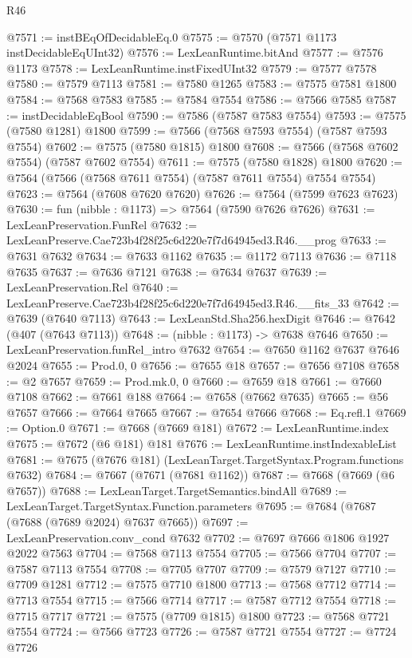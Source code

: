\begin{lexlean}{R46}
\begin{coremodule}
@7571 := instBEqOfDecidableEq.{0}
@7575 := @7570 (@7571 @1173 instDecidableEqUInt32)
@7576 := LexLeanRuntime.bitAnd
@7577 := @7576 @1173
@7578 := LexLeanRuntime.instFixedUInt32
@7579 := @7577 @7578
@7580 := @7579 @7113
@7581 := @7580 @1265
@7583 := @7575 @7581 @1800
@7584 := @7568 @7583
@7585 := @7584 @7554
@7586 := @7566 @7585
@7587 := instDecidableEqBool
@7590 := @7586 (@7587 @7583 @7554)
@7593 := @7575 (@7580 @1281) @1800
@7599 := @7566 (@7568 @7593 @7554) (@7587 @7593 @7554)
@7602 := @7575 (@7580 @1815) @1800
@7608 := @7566 (@7568 @7602 @7554) (@7587 @7602 @7554)
@7611 := @7575 (@7580 @1828) @1800
@7620 := @7564 (@7566 (@7568 @7611 @7554) (@7587 @7611 @7554) @7554 @7554)
@7623 := @7564 (@7608 @7620 @7620)
@7626 := @7564 (@7599 @7623 @7623)
@7630 := fun (nibble : @1173) => @7564 (@7590 @7626 @7626)
@7631 := LexLeanPreservation.FunRel
@7632 := LexLeanPreserve.Cae723b4f28f25c6d220e7f7d64945ed3.R46.__prog
@7633 := @7631 @7632
@7634 := @7633 @1162
@7635 := @1172 @7113
@7636 := @7118 @7635
@7637 := @7636 @7121
@7638 := @7634 @7637
@7639 := LexLeanPreservation.Rel
@7640 := LexLeanPreserve.Cae723b4f28f25c6d220e7f7d64945ed3.R46.__fits_33
@7642 := @7639 (@7640 @7113)
@7643 := LexLeanStd.Sha256.hexDigit
@7646 := @7642 (@407 (@7643 @7113))
@7648 := (nibble : @1173) -> @7638 @7646
@7650 := LexLeanPreservation.funRel_intro @7632
@7654 := @7650 @1162 @7637 @7646 @2024
@7655 := Prod.{0, 0}
@7656 := @7655 @18
@7657 := @7656 @7108
@7658 := @2 @7657
@7659 := Prod.mk.{0, 0}
@7660 := @7659 @18
@7661 := @7660 @7108
@7662 := @7661 @188
@7664 := @7658 (@7662 @7635)
@7665 := @56 @7657
@7666 := @7664 @7665
@7667 := @7654 @7666
@7668 := Eq.refl.{1}
@7669 := Option.{0}
@7671 := @7668 (@7669 @181)
@7672 := LexLeanRuntime.index
@7675 := @7672 (@6 @181) @181
@7676 := LexLeanRuntime.instIndexableList
@7681 := @7675 (@7676 @181) (LexLeanTarget.TargetSyntax.Program.functions @7632)
@7684 := @7667 (@7671 (@7681 @1162))
@7687 := @7668 (@7669 (@6 @7657))
@7688 := LexLeanTarget.TargetSemantics.bindAll
@7689 := LexLeanTarget.TargetSyntax.Function.parameters
@7695 := @7684 (@7687 (@7688 (@7689 @2024) @7637 @7665))
@7697 := LexLeanPreservation.conv_cond @7632
@7702 := @7697 @7666 @1806 @1927 @2022 @7563
@7704 := @7568 @7113 @7554
@7705 := @7566 @7704
@7707 := @7587 @7113 @7554
@7708 := @7705 @7707
@7709 := @7579 @7127
@7710 := @7709 @1281
@7712 := @7575 @7710 @1800
@7713 := @7568 @7712
@7714 := @7713 @7554
@7715 := @7566 @7714
@7717 := @7587 @7712 @7554
@7718 := @7715 @7717
@7721 := @7575 (@7709 @1815) @1800
@7723 := @7568 @7721 @7554
@7724 := @7566 @7723
@7726 := @7587 @7721 @7554
@7727 := @7724 @7726

\end{coremodule}
\end{lexlean}
